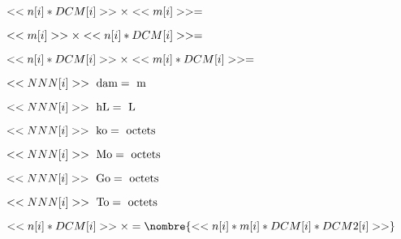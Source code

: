 \documentclass[a4paper,11pt,fleqn]{article}
\begin{document}
\pagestyle{empty}

\exo{}
\begin{multicols}{2}\noindent
\begin{spacing}{2}
$<<n[i]*DCM[i]>>\times<<m[i]>>=\dotfill$

$<<m[i]>>\times<<n[i]*DCM[i]>>=\dotfill$

$<<n[i]*DCM[i]>>\times<<m[i]*DCM[i]>>=\dotfill$


\end{spacing}
\end{multicols}

\exo{}
\begin{multicols}{2}\noindent
\begin{spacing}{2}
$<<NNN[i]>>~\text{dam}=\dotfill~\text{m}$

$<<NNN[i]>>~\text{hL}=\dotfill~\text{L}$

$<<NNN[i]>>~\text{ko}=\dotfill~\text{octets}$

$<<NNN[i]>>~\text{Mo}=\dotfill~\text{octets}$

$<<NNN[i]>>~\text{Go}=\dotfill~\text{octets}$

$<<NNN[i]>>~\text{To}=\dotfill~\text{octets}$


\end{spacing}
\end{multicols}


\begin{multicols}{2}\noindent
\begin{spacing}{2}
$<<n[i]*DCM[i]>>\times\dotfill=\nombre{<<n[i]*m[i]*DCM[i]*DCM2[i]>>}$


\end{spacing}
\end{multicols}
\end{document}
